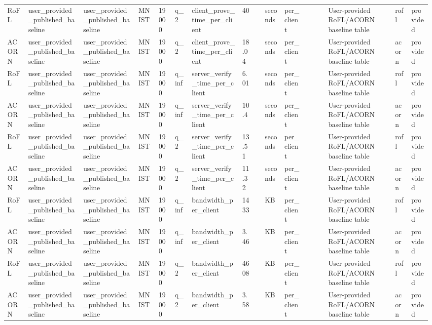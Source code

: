 \begin{table}[t]
\begin{tabular}{lllllllllllllllll}
RoFL & user\_provided\_published\_baseline & user\_provided\_published\_baseline & MNIST & 19000 & q\_2 & client\_prove\_time\_per\_client & 40 &  & seconds & per\_client &  &  &  & User-provided RoFL/ACORN baseline table & rofl & provided \\
ACORN & user\_provided\_published\_baseline & user\_provided\_published\_baseline & MNIST & 19000 & q\_2 & client\_prove\_time\_per\_client & 18.04 &  & seconds & per\_client &  &  &  & User-provided RoFL/ACORN baseline table & acorn & provided \\
RoFL & user\_provided\_published\_baseline & user\_provided\_published\_baseline & MNIST & 19000 & q\_inf & server\_verify\_time\_per\_client & 6.01 &  & seconds & per\_client &  &  &  & User-provided RoFL/ACORN baseline table & rofl & provided \\
ACORN & user\_provided\_published\_baseline & user\_provided\_published\_baseline & MNIST & 19000 & q\_inf & server\_verify\_time\_per\_client & 10.4 &  & seconds & per\_client &  &  &  & User-provided RoFL/ACORN baseline table & acorn & provided \\
RoFL & user\_provided\_published\_baseline & user\_provided\_published\_baseline & MNIST & 19000 & q\_2 & server\_verify\_time\_per\_client & 13.51 &  & seconds & per\_client &  &  &  & User-provided RoFL/ACORN baseline table & rofl & provided \\
ACORN & user\_provided\_published\_baseline & user\_provided\_published\_baseline & MNIST & 19000 & q\_2 & server\_verify\_time\_per\_client & 11.32 &  & seconds & per\_client &  &  &  & User-provided RoFL/ACORN baseline table & acorn & provided \\
RoFL & user\_provided\_published\_baseline & user\_provided\_published\_baseline & MNIST & 19000 & q\_inf & bandwidth\_per\_client & 1433 &  & KB & per\_client &  &  &  & User-provided RoFL/ACORN baseline table & rofl & provided \\
ACORN & user\_provided\_published\_baseline & user\_provided\_published\_baseline & MNIST & 19000 & q\_inf & bandwidth\_per\_client & 3.46 &  & KB & per\_client &  &  &  & User-provided RoFL/ACORN baseline table & acorn & provided \\
RoFL & user\_provided\_published\_baseline & user\_provided\_published\_baseline & MNIST & 19000 & q\_2 & bandwidth\_per\_client & 4608 &  & KB & per\_client &  &  &  & User-provided RoFL/ACORN baseline table & rofl & provided \\
ACORN & user\_provided\_published\_baseline & user\_provided\_published\_baseline & MNIST & 19000 & q\_2 & bandwidth\_per\_client & 3.58 &  & KB & per\_client &  &  &  & User-provided RoFL/ACORN baseline table & acorn & provided \\

\end{tabular}
\end{table}
